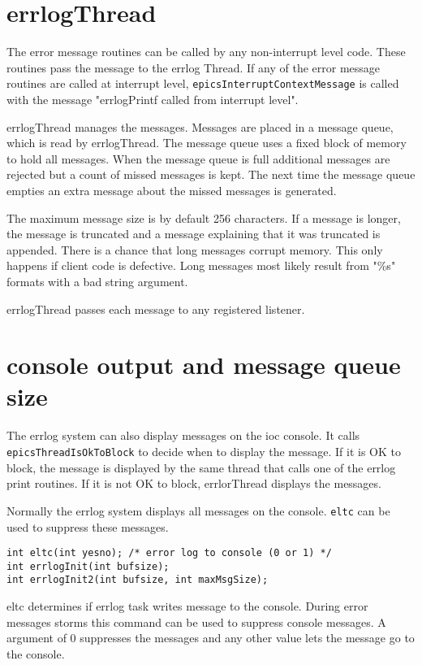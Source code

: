 \section{errlogThread}

The error message routines can be called by any non-interrupt level code. These routines pass the message to the errlog 
Thread. If any of the error message routines are called at interrupt level,  \verb|epicsInterruptContextMessage| is 
called with the message "errlogPrintf called from interrupt level".

errlogThread manages the messages. Messages are placed in a message queue, which is read by errlogThread. The 
message queue uses a fixed block of memory to hold all messages. When the message queue is full additional messages 
are rejected but a count of missed messages is kept. The next time the message queue empties an extra message about the 
missed messages is generated.

The maximum message size is by default 256  characters. If a message is longer, the message is truncated and a message 
explaining that it was truncated is appended. There is a chance that long messages corrupt memory. This  only happens if 
client code is defective. Long messages most likely result from "\%s" formats with a bad string argument.

errlogThread passes each message to any registered listener.

\section{console output and message queue size}

The errlog system can also display messages on the ioc console. It calls \verb|epicsThreadIsOkToBlock| to decide when 
to display the message. If it is OK to block, the message is displayed by the same thread that calls one of the errlog print 
routines. If it is not OK to block, errlorThread displays the messages.

Normally the errlog system displays all messages on the console. \verb|eltc| can be used to suppress these messages.

\begin{verbatim}int eltc(int yesno); /* error log to console (0 or 1) */
int errlogInit(int bufsize);
int errlogInit2(int bufsize, int maxMsgSize);
\end{verbatim}
eltc determines if errlog task writes message to the console. During error messages storms  this  command can be used to 
suppress console messages. A argument of 0 suppresses the messages and any other value lets the message go to the 
console. 

